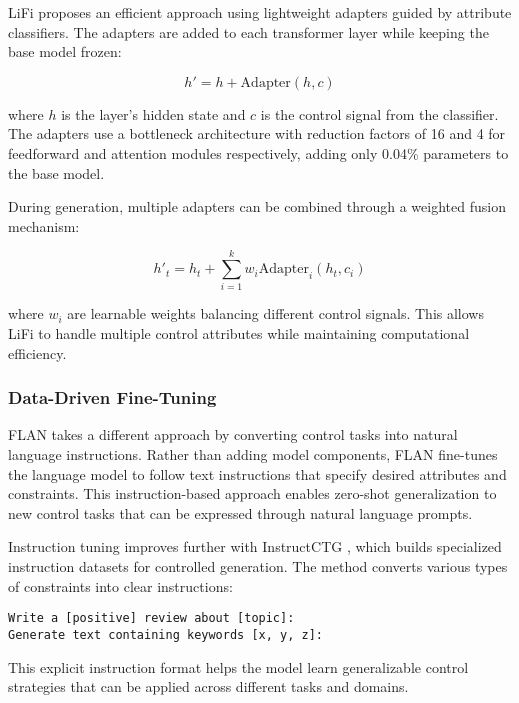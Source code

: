 LiFi \cite{shi2024lifilightweightcontrolledtext} proposes an efficient approach using lightweight adapters guided by attribute classifiers. The adapters are added to each transformer layer while keeping the base model frozen:

\begin{equation}
    h' = h + \text{Adapter}(h, c)
\end{equation}

where $h$ is the layer's hidden state and $c$ is the control signal from the classifier. The adapters use a bottleneck architecture with reduction factors of 16 and 4 for feedforward and attention modules respectively, adding only 0.04\% parameters to the base model.

During generation, multiple adapters can be combined through a weighted fusion mechanism:

\begin{equation}
    h'_t = h_t + \sum_{i=1}^k w_i \text{Adapter}_i(h_t, c_i)
\end{equation}

where $w_i$ are learnable weights balancing different control signals. This allows LiFi to handle multiple control attributes while maintaining computational efficiency.

\subsubsection{Data-Driven Fine-Tuning}

FLAN \cite{wei2022finetunedaszeroshotlearners} takes a different approach by converting control tasks into natural language instructions. Rather than adding model components, FLAN fine-tunes the language model to follow text instructions that specify desired attributes and constraints. This instruction-based approach enables zero-shot generalization to new control tasks that can be expressed through natural language prompts.

Instruction tuning improves further with InstructCTG \cite{zhou2023controllabletextgenerationnatural}, which builds specialized instruction datasets for controlled generation. The method converts various types of constraints into clear instructions:

\begin{verbatim}
Write a [positive] review about [topic]:
Generate text containing keywords [x, y, z]:
\end{verbatim}

This explicit instruction format helps the model learn generalizable control strategies that can be applied across different tasks and domains.